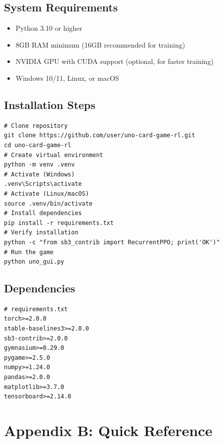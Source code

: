 \documentclass[12pt,a4paper]{article}
\begin{document}
\subsection*{System Requirements}
\begin{itemize}
    \item Python 3.10 or higher
    \item 8GB RAM minimum (16GB recommended for training)
    \item NVIDIA GPU with CUDA support (optional, for faster training)
    \item Windows 10/11, Linux, or macOS
\end{itemize}
\subsection*{Installation Steps}
\lstset{language=bash}
\begin{lstlisting}
# Clone repository
git clone https://github.com/user/uno-card-game-rl.git
cd uno-card-game-rl
# Create virtual environment
python -m venv .venv
# Activate (Windows)
.venv\Scripts\activate
# Activate (Linux/macOS)
source .venv/bin/activate
# Install dependencies
pip install -r requirements.txt
# Verify installation
python -c "from sb3_contrib import RecurrentPPO; print('OK')"
# Run the game
python uno_gui.py
\end{lstlisting}
\subsection*{Dependencies}
\begin{lstlisting}
# requirements.txt
torch>=2.0.0
stable-baselines3>=2.0.0
sb3-contrib>=2.0.0
gymnasium>=0.29.0
pygame>=2.5.0
numpy>=1.24.0
pandas>=2.0.0
matplotlib>=3.7.0
tensorboard>=2.14.0
\end{lstlisting}
\newpage
\section*{Appendix B: Quick Reference}
\end{document}
